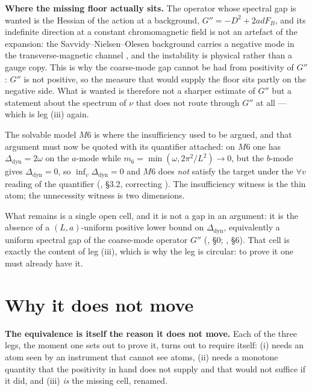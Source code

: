 \smallskip
\noindent\textbf{Where the missing floor actually sits.} The operator whose spectral gap is wanted is
the Hessian of the action at a background, $G''=-D^{2}+2adF_B$, and its indefinite direction at a
constant chromomagnetic field is not an artefact of the expansion: the Savvidy--Nielsen--Olesen
background \cite{savvidy,no} carries a negative mode in the transverse-magnetic channel
\cite{leutwyler}, and the instability is physical rather than a gauge copy. This is why the coarse-mode
gap cannot be had from positivity of $G''$: $G''$ is not positive, so the measure that would supply
the floor sits partly on the negative side. What is wanted is therefore not a sharper estimate of
$G''$ but a statement about the spectrum of $\nu$ that does not route through $G''$ at all --- which
is leg (iii) again.

The solvable model $M6$ is where the insufficiency used to be argued, and that argument must now be
quoted with its quantifier attached: on $M6$ one has $\Delta_{\mathrm{dyn}}=2\omega$ on the
$a$-mode while $m_6=\min(\omega,2\pi^2/L^2)\to0$, but the $b$-mode gives $\Delta_{\mathrm{dyn}}=0$,
so $\inf_v\Delta_{\mathrm{dyn}}=0$ and $M6$ does \emph{not} satisfy the target under the
$\forall v$ reading of the quantifier (, \S3.2, correcting
). The insufficiency witness is the thin atom; the unnecessity witness is two
dimensions.

What remains is a single open cell, and it is not a gap in an argument: it is the absence of a
$(L,a)$-uniform positive lower bound on $\Delta_{\mathrm{dyn}}$, equivalently a uniform spectral gap
of the coarse-mode operator $G''$ (, \S0; , \S6). That cell
is exactly the content of leg (iii), which is why the leg is circular: to prove it one must already
have it.

\section{Why it does not move}
\label{sec:reduction-nomove}

\begin{qbox}
\textbf{The equivalence is itself the reason it does not move.} Each of the three legs, the moment
one sets out to prove it, turns out to require itself: (i) needs an atom seen by an instrument that
cannot see atoms, (ii) needs a monotone quantity that the positivity in hand does not supply and
that would not suffice if it did, and (iii) \emph{is} the missing cell, renamed.
\end{qbox}

